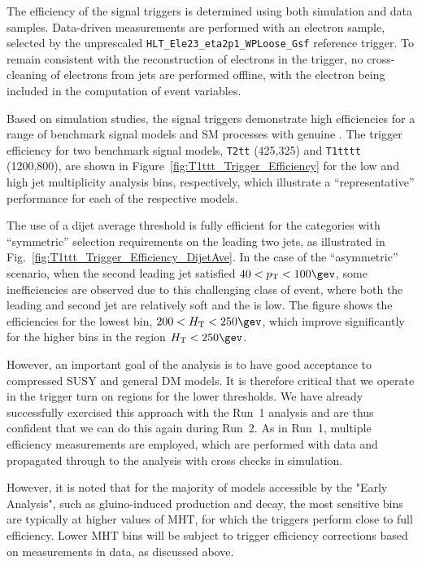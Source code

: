 The efficiency of the signal triggers is determined using both
simulation and data samples. Data-driven measurements are performed with an electron sample, selected by the
unprescaled \verb!HLT_Ele23_eta2p1_WPLoose_Gsf! reference trigger. To remain consistent with the reconstruction 
of electrons in the trigger, no cross-cleaning of electrons from jets are performed offline, with
the electron being included in the computation of event variables.

Based on simulation studies, the signal triggers demonstrate high
efficiencies for a range of benchmark signal models and SM processes
with genuine \met. The trigger efficiency for two benchmark signal
models, \texttt{T2tt} (425,325) and \texttt{T1tttt} (1200,800), are
shown in Figure~\ref{fig:T1ttt_Trigger_Efficiency} for the low and
high jet multiplicity analysis bins, respectively, which illustrate a
``representative'' performance for each of the respective models.
  
The use of a dijet average threshold is fully efficient for the
categories with ``symmetric'' \Pt selection requirements on the
leading two jets, as illustrated in
Fig.~\ref{fig:T1ttt_Trigger_Efficiency_DijetAve}. In the case of the
``asymmetric'' scenario, when the second leading jet satisfied $40 <
\Pt < 100\gev$, some inefficiencies are observed due to this
challenging class of event, where both the leading and second jet
are relatively soft and the \scalht is low. The figure shows the
efficiencies for the lowest \scalht bin, $200 < \scalht < 250\gev$, 
which improve significantly for the higher \scalht bins in the region
$\scalht < 250\gev$. 

However, an important goal of the analysis is to have good acceptance
to compressed SUSY and general DM models. It is therefore critical
that we operate in the trigger turn on regions for the lower
thresholds. We have already successfully exercised this approach with
the Run~1 analysis and are thus confident that we can do this again
during Run~2. As in Run~1, multiple efficiency measurements are
employed, which are performed with data and propagated through to the
analysis with cross checks in simulation.

However, it is noted that for the majority of models accessible by the
"Early Analysis", such as gluino-induced production and decay, the
most sensitive bins are typically at higher values of MHT, for which
the triggers perform close to full efficiency. Lower MHT bins will be
subject to trigger efficiency corrections based on measurements in
data, as discussed above. 


